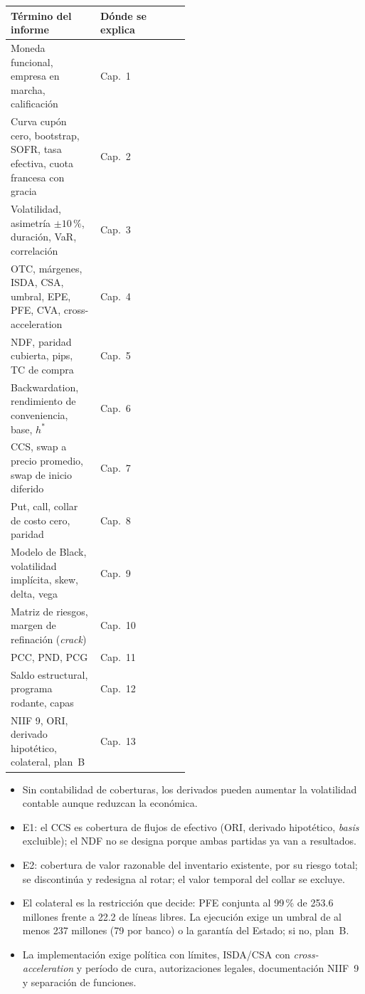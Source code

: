 \begin{center}\small
\begin{tabularx}{\linewidth}{@{}>{\raggedright\arraybackslash}p{0.5\linewidth}X@{}}
\toprule
Término del informe & Dónde se explica\\
\midrule
Moneda funcional, empresa en marcha, calificación & Cap.~1\\
Curva cupón cero, bootstrap, SOFR, tasa efectiva, cuota francesa con gracia & Cap.~2\\
Volatilidad, asimetría $\pm10\,\%$, duración, VaR, correlación & Cap.~3\\
OTC, márgenes, ISDA, CSA, umbral, EPE, PFE, CVA, cross-acceleration & Cap.~4\\
NDF, paridad cubierta, pips, TC de compra & Cap.~5\\
Backwardation, rendimiento de conveniencia, base, $h^*$ & Cap.~6\\
CCS, swap a precio promedio, swap de inicio diferido & Cap.~7\\
Put, call, collar de costo cero, paridad & Cap.~8\\
Modelo de Black, volatilidad implícita, skew, delta, vega & Cap.~9\\
Matriz de riesgos, margen de refinación (\emph{crack}) & Cap.~10\\
PCC, PND, PCG & Cap.~11\\
Saldo estructural, programa rodante, capas & Cap.~12\\
NIIF 9, ORI, derivado hipotético, colateral, plan~B & Cap.~13\\
\bottomrule
\end{tabularx}
\end{center}

\begin{resumen}
\begin{itemize}
\item Sin contabilidad de coberturas, los derivados pueden aumentar la volatilidad contable aunque reduzcan la económica.
\item E1: el CCS es cobertura de flujos de efectivo (ORI, derivado hipotético, \emph{basis} excluible); el NDF no se designa porque ambas partidas ya van a resultados.
\item E2: cobertura de valor razonable del inventario existente, por su riesgo total; se discontinúa y redesigna al rotar; el valor temporal del collar se excluye.
\item El colateral es la restricción que decide: PFE conjunta al 99\,\% de 253.6 millones frente a 22.2 de líneas libres. La ejecución exige un umbral de al menos 237 millones (79 por banco) o la garantía del Estado; si no, plan~B.
\item La implementación exige política con límites, ISDA/CSA con \emph{cross-acceleration} y período de cura, autorizaciones legales, documentación NIIF~9 y separación de funciones.
\end{itemize}
\end{resumen}

